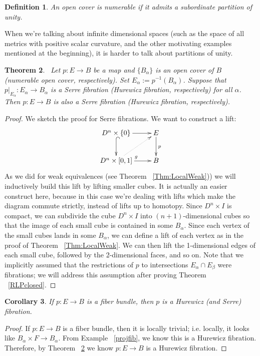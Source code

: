 \documentclass{article}
\newtheorem{theorem}{Theorem}[section]
\newtheorem{corollary}[theorem]{Corollary}
\newtheorem{definition}[theorem]{Definition}
\newtheorem{proposed work}[theorem]{Proposed Work}
\theoremstyle{definition}
\newcommand{\xymat}[1]{\begin{align*}\xymatrix{ #1}\end{align*}}
\begin{document}
\begin{definition}
An open cover is numerable if it admits a subordinate partition of unity.
\end{definition}

When we're talking about infinite dimensional spaces (such as the space of all metrics with positive scalar curvature, and the other motivating examples mentioned at the beginning), it is harder to talk about partitions of unity. 


\begin{theorem}~\label{fibcov}
Let $p:E\to B$ be a map and $\lbrace B_\alpha\rbrace$ is an open cover of $B$ (numerable open cover, respectively). Set $E_\alpha:=p^{-1}(B_\alpha)$. Suppose that $p|_{E_\alpha} : E_\alpha \to B_\alpha$ is a Serre fibration (Hurewicz fibration, respectively) for all $\alpha$. Then $p:E\to B$ is also a Serre fibration (Hurewicz fibration, respectively). 
\end{theorem}

\begin{proof}
We sketch the proof for Serre fibrations. We want to construct a lift: 
\xymat{D^n\times \lbrace 0\rbrace \ar[r] \ar@{^{(}->}[d] & E \ar[d]^p \\ D^n\times [0,1] \ar[r]^g \ar@{.>}[ur] & B}
As we did for weak equivalences (see Theorem ~\ref{Thm:LocalWeak})) we will inductively build this lift by lifting smaller cubes. It is actually an easier construct here, because in this case we're dealing with lifts which make the diagram commute strictly, instead of lifts up to homotopy. Since $D^n \times I$ is compact, we can subdivide the cube $D^n \times I$ into $(n+1)$-dimensional cubes so that the image of each small cube is contained in some $B_\alpha$. Since each vertex of the small cubes lands in some $B_\alpha$, we can define a lift of each vertex as in the proof of Theorem ~\ref{Thm:LocalWeak}. We can then lift the 1-dimensional edges of each small cube, followed by the 2-dimensional faces, and so on. Note that we implicitly assumed that the restrictions of $p$ to intersections $E_\alpha \cap E_\beta$ were fibrations; we will address this assumption after proving Theorem ~\ref{RLPclosed}.
\end{proof}

\begin{corollary}
If $p:E\to B$ is a fiber bundle, then $p$ is a Hurewicz (and Serre) fibration.
\end{corollary}
\begin{proof}
If $p:E\to B$ is a fiber bundle, then it is locally trivial; i.e. locally, it looks like $B_\alpha\times F\to B_\alpha$. From Example ~\ref{projfib}, we know this is a Hurewicz fibration. Therefore, by Theorem ~\ref{fibcov} we know $p:E\to B$ is a Hurewicz fibration.
\end{proof}
\end{document}
